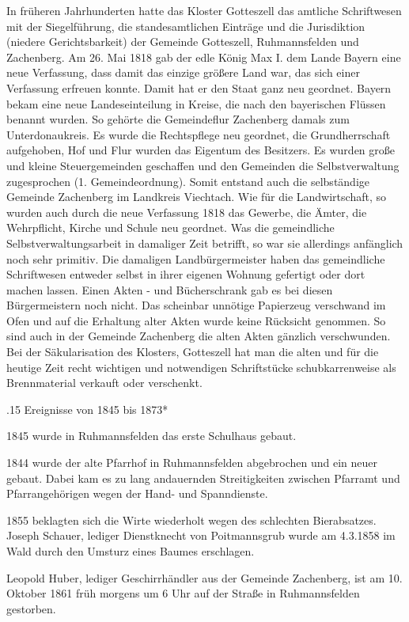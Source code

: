 In früheren Jahrhunderten hatte das Kloster Gotteszell das amtliche Schriftwesen
mit der Siegelführung, die standesamtlichen Einträge und die Jurisdiktion
(niedere Gerichtsbarkeit) der Gemeinde Gotteszell, Ruhmannsfelden und
Zachenberg. Am 26. Mai 1818 gab der edle König Max I. dem Lande Bayern eine neue
Verfassung, dass damit das einzige größere Land war, das sich einer Verfassung
erfreuen konnte. Damit hat er den Staat ganz neu geordnet. Bayern bekam eine
neue Landeseinteilung in Kreise, die nach den bayerischen Flüssen benannt
wurden. So gehörte die Gemeindeflur Zachenberg damals zum Unterdonaukreis. Es
wurde die Rechtspflege neu geordnet, die Grundherrschaft aufgehoben, Hof und
Flur wurden das Eigentum des Besitzers. Es wurden große und kleine
Steuergemeinden geschaffen und den Gemeinden die Selbstverwaltung zugesprochen
(1. Gemeindeordnung). Somit entstand auch die selbständige Gemeinde Zachenberg
im Landkreis Viechtach. Wie für die Landwirtschaft, so wurden auch durch die
neue Verfassung 1818 das Gewerbe, die Ämter, die Wehrpflicht, Kirche und Schule
neu geordnet. Was die gemeindliche Selbstverwaltungsarbeit in damaliger Zeit
betrifft, so war sie allerdings anfänglich noch sehr primitiv. Die damaligen
Landbürgermeister haben das gemeindliche Schriftwesen entweder selbst in ihrer
eigenen Wohnung gefertigt oder dort machen lassen. Einen Akten - und
Bücherschrank gab es bei diesen Bürgermeistern noch nicht. Das scheinbar
unnötige Papierzeug verschwand im Ofen und auf die Erhaltung alter Akten wurde
keine Rücksicht genommen. So sind auch in der Gemeinde Zachenberg die alten
Akten gänzlich verschwunden. Bei der Säkularisation des Klosters, Gotteszell hat
man die alten und für die heutige Zeit recht wichtigen und notwendigen
Schriftstücke schubkarrenweise als Brennmaterial verkauft oder verschenkt.

.15 Ereignisse von 1845 bis 1873*

1845 wurde in Ruhmannsfelden das erste Schulhaus gebaut.

1844 wurde der alte Pfarrhof in Ruhmannsfelden abgebrochen und ein neuer gebaut.
Dabei kam es zu lang andauernden Streitigkeiten zwischen Pfarramt und
Pfarrangehörigen wegen der Hand- und Spanndienste.

1855 beklagten sich die Wirte wiederholt wegen des schlechten Bierabsatzes.
Joseph Schauer, lediger Dienstknecht von Poitmannsgrub wurde am 4.3.1858 im Wald
durch den Umsturz eines Baumes erschlagen.

Leopold Huber, lediger Geschirrhändler aus der Gemeinde Zachenberg, ist am 10.
Oktober 1861 früh morgens um 6 Uhr auf der Straße in Ruhmannsfelden gestorben.

